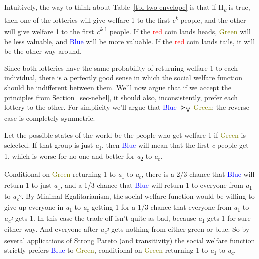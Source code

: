 \documentclass[
  11pt,
  letterpaper,
  DIV=11,
  numbers=noendperiod,
  twoside]{scrartcl}
\begin{document}
Intuitively, the way to think about Table~\ref{tbl-two-envelope} is that
if H\textsubscript{\emph{k}} is true, then one of the lotteries will
give welfare 1 to the first \emph{c}\textsuperscript{\emph{k}} people,
and the other will give welfare 1 to the first
\emph{c}\textsuperscript{\emph{k}-1} people. If the \textcolor{red}{red}
coin lands heads, \textcolor{olive}{Green} will be less valuable, and
\textcolor{blue}{Blue} will be more valuable. If the
\textcolor{red}{red} coin lands tails, it will be the other way around.

Since both lotteries have the same probability of returning welfare 1 to
each individual, there is a perfectly good sense in which the social
welfare function should be indifferent between them. We'll now argue
that if we accept the principles from Section~\ref{sec-nebel}, it should
also, inconsistently, prefer each lottery to the other. For simplicity
we'll argue that
\textcolor{blue}{Blue}~≻\textsubscript{∀}~\textcolor{olive}{Green}; the
reverse case is completely symmetric.

Let the possible states of the world be the people who get welfare 1 if
\textcolor{olive}{Green} is selected. If that group is just
\emph{a}\textsubscript{1}, then \textcolor{blue}{Blue} will mean that
the first \emph{c} people get 1, which is worse for no one and better
for \emph{a}\textsubscript{2} to \emph{a}\textsubscript{c}.

Conditional on \textcolor{olive}{Green} returning 1 to
\emph{a}\textsubscript{1} to \emph{a}\textsubscript{c}, there is a 2/3
chance that \textcolor{blue}{Blue} will return 1 to just
\emph{a}\textsubscript{1}, and a 1/3 chance that \textcolor{blue}{Blue}
will return 1 to everyone from \emph{a}\textsubscript{1} to
\emph{a}\textsubscript{\emph{c}\textsuperscript{2}}. By Minimal
Egalitarianism, the social welfare function would be willing to give up
everyone in \emph{a}\textsubscript{1} to \emph{a}\textsubscript{c}
getting 1 for a 1/3 chance that everyone from \emph{a}\textsubscript{1}
to \emph{a}\textsubscript{\emph{c}\textsuperscript{2}} gets 1. In this
case the trade-off isn't quite as bad, because \emph{a}\textsubscript{1}
gets 1 for sure either way. And everyone after
\emph{a}\textsubscript{\emph{c}\textsuperscript{2}} gets nothing from
either green or blue. So by several applications of Strong Pareto (and
transitivity) the social welfare function strictly prefers
\textcolor{blue}{Blue} to \textcolor{olive}{Green}, conditional on
\textcolor{olive}{Green} returning 1 to \emph{a}\textsubscript{1} to
\emph{a}\textsubscript{c}.
\end{document}

